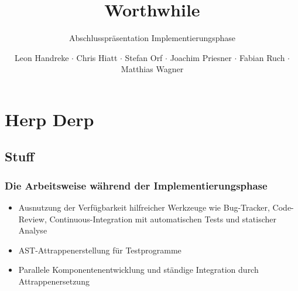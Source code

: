 \documentclass[t]{beamer}
\title{Worthwhile}
\subtitle{Abschlusspräsentation Implementierungsphase}
\author{Leon Handreke $\cdot$ Chris Hiatt $\cdot$ Stefan Orf $\cdot$ Joachim Priesner $\cdot$ Fabian Ruch $\cdot$ Matthias Wagner}
\institute[ITI]{Institut für Theoretische Informatik}
\begin{document}
\begin{frame}
\maketitle
\end{frame}

\section{Herp Derp}
\subsection{Stuff}

\begin{frame}
\frametitle{Die Arbeitsweise während der Implementierungsphase}

\begin{itemize}
    \item<+-> Ausnutzung der Verfügbarkeit hilfreicher Werkzeuge wie Bug-Tracker, Code-Review, Continuous-Integration mit automatischen Tests und statischer Analyse
    \item<+-> AST-Attrappenerstellung für Testprogramme
    \item<+-> Parallele Komponentenentwicklung und ständige Integration durch Attrappenersetzung
\end{itemize}
\end{frame}
\end{document}
